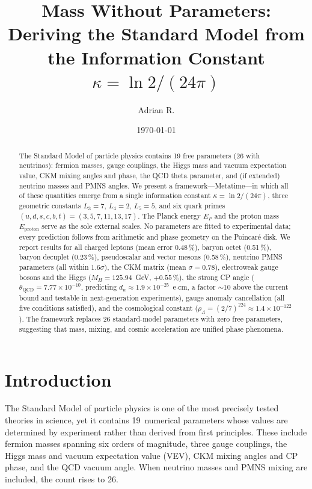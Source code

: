 \documentclass[aps,prd,reprint,twocolumn,showpacs,superscriptaddress]{revtex4-2}
\begin{document}
\title{Mass Without Parameters: Deriving the Standard Model from the Information Constant $\kappa = \ln 2/(24\pi)$}

\author{Adrian R.}

\date{\today}

\begin{abstract}
The Standard Model of particle physics contains 19 free parameters (26 with neutrinos):
fermion masses, gauge couplings, the Higgs mass and vacuum expectation value,
CKM mixing angles and phase, the QCD theta parameter, and (if extended) neutrino
masses and PMNS angles.  We present a framework---Metatime---in which all of these
quantities emerge from a single information constant $\kappa = \ln 2/(24\pi)$,
three geometric constants $L_3 = 7$, $L_4 = 2$, $L_5 = 5$, and six quark primes
$(u,d,s,c,b,t) = (3,5,7,11,13,17)$.  The Planck energy $E_P$ and the proton mass
$E_{\text{proton}}$ serve as the sole external scales.  No parameters are fitted
to experimental data; every prediction follows from arithmetic and phase geometry
on the Poincar\'{e} disk.  We report results for all charged leptons (mean error
0.48\,\%), baryon octet (0.51\,\%), baryon decuplet (0.23\,\%), pseudoscalar and
vector mesons (0.58\,\%), neutrino PMNS parameters (all within $1.6\sigma$),
the CKM matrix (mean $\sigma = 0.78$), electroweak gauge bosons and the Higgs
($M_H = 125.94$~GeV, $+0.55\,\%$), the strong CP angle
($\theta_{\text{QCD}} = 7.77 \times 10^{-10}$, predicting $d_n \approx
1.9 \times 10^{-25}$~e$\cdot$cm, a factor $\sim 10$ above the current
bound and testable in next-generation experiments), gauge anomaly cancellation
(all five conditions satisfied), and the cosmological constant
($\rho_\Lambda = (2/7)^{224} \approx 1.4 \times 10^{-122}$).
The framework replaces 26 standard-model parameters with zero free parameters,
suggesting that mass, mixing, and cosmic acceleration are unified phase phenomena.
\end{abstract}

\maketitle

\section{Introduction}

The Standard Model of particle physics is one of the most precisely tested
theories in science, yet it contains 19~numerical parameters whose values
are determined by experiment rather than derived from first principles.
These include fermion masses spanning six orders of magnitude, three gauge
couplings, the Higgs mass and vacuum expectation value (VEV), CKM mixing
angles and CP phase, and the QCD vacuum angle.  When neutrino masses and
PMNS mixing are included, the count rises to 26.
\end{document}
